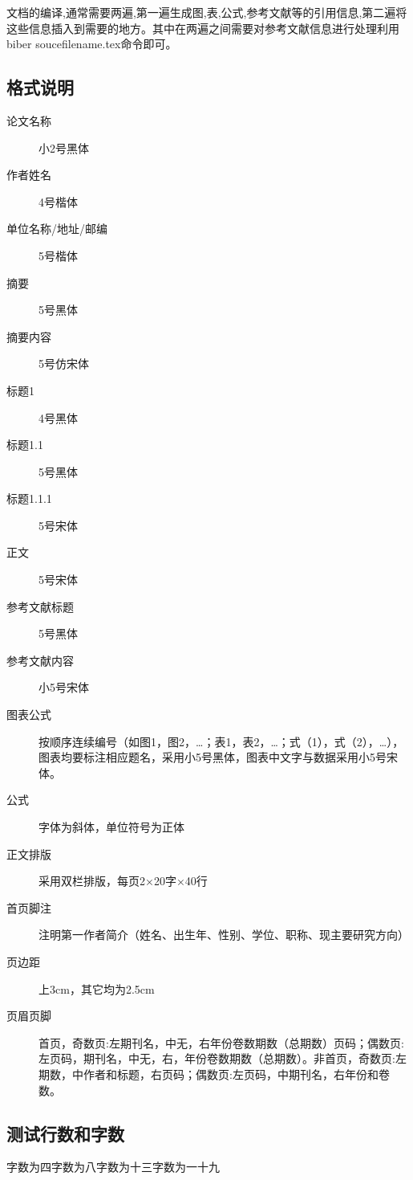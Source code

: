 文档的编译,通常需要两遍,第一遍生成图,表,公式,参考文献等的引用信息,第二遍将这些信息插入到需要的地方。其中在两遍之间需要对参考文献信息进行处理利用biber soucefilename.tex命令即可。

\subsection{格式说明}
\begin{description}
  \item[论文名称] 小2号黑体
  \item[作者姓名] 4号楷体
  \item[单位名称/地址/邮编] 5号楷体
  \item[摘要] 5号黑体
  \item[摘要内容] 5号仿宋体
  \item[标题1] 4号黑体
  \item[标题1.1] 5号黑体
  \item[标题1.1.1] 5号宋体
  \item[正文] 5号宋体
  \item[参考文献标题] 5号黑体
  \item[参考文献内容] 小5号宋体
  \item[图表公式] 按顺序连续编号（如图1，图2，…；表1，表2，…；式（1），式（2），…），
图表均要标注相应题名，采用小5号黑体，图表中文字与数据采用小5号宋体。
  \item[公式] 字体为斜体，单位符号为正体
  \item[正文排版] 采用双栏排版，每页2×20字×40行
  \item[首页脚注] 注明第一作者简介（姓名、出生年、性别、学位、职称、现主要研究方向）
  \item[页边距] 上3cm，其它均为2.5cm
  \item[页眉页脚] 首页，奇数页:左期刊名，中无，右年份卷数期数（总期数）页码；偶数页:左页码，期刊名，中无，右，年份卷数期数（总期数）。非首页，奇数页:左期数，中作者和标题，右页码；偶数页:左页码，中期刊名，右年份和卷数。
\end{description}

\subsection{测试行数和字数}

  \setcounter{linestoprint}{0}
{\addtocounter{linestoprint}{1}\noindent 字数为四字数为八字数为十三\hfill 字数为一十九\thelinestoprint\par}
\lipsum[1-4]

%


